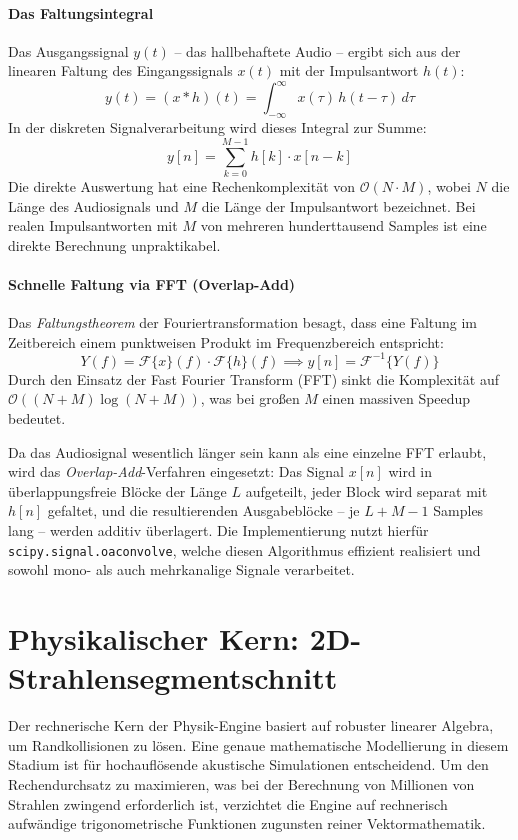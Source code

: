 \documentclass{article}
\begin{document}
    \paragraph{Das Faltungsintegral}

    Das Ausgangssignal $y(t)$ -- das hallbehaftete Audio -- ergibt sich aus der linearen
    Faltung des Eingangssignals $x(t)$ mit der Impulsantwort $h(t)$:
    \[y(t) = (x * h)(t) = \int_{-\infty}^{\infty} x(\tau)\, h(t - \tau)\, d\tau\]
    In der diskreten Signalverarbeitung wird dieses Integral zur Summe:
    \[y[n] = \sum_{k=0}^{M-1} h[k] \cdot x[n - k]\]
    Die direkte Auswertung hat eine Rechenkomplexität von $\mathcal{O}(N \cdot M)$, wobei $N$
    die Länge des Audiosignals und $M$ die Länge der Impulsantwort bezeichnet.
    Bei realen Impulsantworten mit $M$ von mehreren hunderttausend Samples ist eine direkte
    Berechnung unpraktikabel.

    \paragraph{Schnelle Faltung via FFT (Overlap-Add)}

    Das \emph{Faltungstheorem} der Fouriertransformation besagt, dass eine Faltung im
    Zeitbereich einem punktweisen Produkt im Frequenzbereich entspricht:
    \[Y(f) = \mathcal{F}\{x\}(f) \cdot \mathcal{F}\{h\}(f)
    \implies y[n] = \mathcal{F}^{-1}\{Y(f)\}\]
    Durch den Einsatz der Fast Fourier Transform (FFT) sinkt die Komplexität auf
    $\mathcal{O}((N+M)\log(N+M))$, was bei großen $M$ einen massiven Speedup bedeutet.

    Da das Audiosignal wesentlich länger sein kann als eine einzelne FFT erlaubt,
    wird das \emph{Overlap-Add}-Verfahren eingesetzt: Das Signal $x[n]$ wird in
    überlappungsfreie Blöcke der Länge $L$ aufgeteilt, jeder Block wird separat mit $h[n]$
    gefaltet, und die resultierenden Ausgabeblöcke -- je $L + M - 1$ Samples lang -- werden
    additiv überlagert. Die Implementierung nutzt hierfür
    \texttt{scipy.signal.oaconvolve}, welche diesen Algorithmus effizient realisiert und
    sowohl mono- als auch mehrkanalige Signale verarbeitet.


    \section{Physikalischer Kern: 2D-Strahlensegmentschnitt}
    \label{sec:2d_ray_intersection}

    Der rechnerische Kern der Physik-Engine basiert auf robuster linearer Algebra, um Randkollisionen zu lösen.
    Eine genaue mathematische Modellierung in diesem Stadium ist für hochauflösende akustische Simulationen entscheidend.
    Um den Rechendurchsatz zu maximieren, was bei der Berechnung von Millionen von Strahlen zwingend erforderlich ist, verzichtet die Engine auf
    rechnerisch aufwändige trigonometrische Funktionen zugunsten reiner Vektormathematik.
\end{document}
